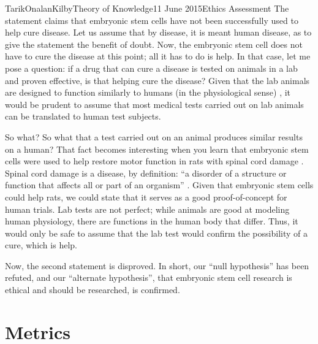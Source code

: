\documentclass[a4paper,12pt]{article}
\begin{document}
\begin{mla}{Tarik}{Onalan}{Kilby}{Theory of Knowledge}{11 June 2015}{Ethics Assessment}
            The statement claims that embryonic stem cells have not been successfully used to help
            cure disease. Let us assume that by disease, it is meant human disease, as to give the
            statement the benefit of doubt. Now, the embryonic stem cell does not have to cure the
            disease at this point; all it has to do is help. In that case, let me pose a question:
            if a drug that can cure a disease is tested on animals in a lab and proven effective, is
            that helping cure the disease? Given that the lab animals are designed to function similarly
            to humans (in the physiological sense) \cite{NIH}, it would be prudent to assume that
            most medical tests carried out on lab animals can be translated to human test subjects.

            So what? So what that a test carried out on an animal produces similar results on a human?
            That fact becomes interesting when you learn that embryonic stem cells were used to help
            restore motor function in rats with spinal cord damage \cite{stem}. Spinal
            cord damage is a disease, by definition: ``a disorder of a structure or function that
            affects all or part of an organism'' \cite{oxford}. Given that embryonic stem cells
            could help rats, we could state that it serves as a good proof-of-concept for human trials.
            Lab tests are not perfect; while animals are good at modeling human physiology, there are
            functions in the human body that differ. Thus, it would only be safe to assume that the
            lab test would confirm the possibility of a cure, which is help.

            Now, the second statement is disproved. In short, our ``null hypothesis'' has been refuted,
            and our ``alternate hypothesis'', that embryonic stem cell research is ethical and should
            be researched, is confirmed. 
        \section{Metrics}

\end{mla}
\end{document}
